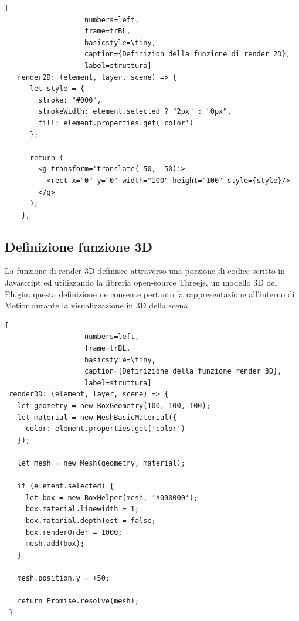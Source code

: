 \begin{lstlisting}[
                   numbers=left,
                   frame=trBL,
                   basicstyle=\tiny,
                   caption={Definizion della funzione di render 2D},
                   label=struttura]
   render2D: (element, layer, scene) => {
      let style = {
        stroke: "#000",
        strokeWidth: element.selected ? "2px" : "0px",
        fill: element.properties.get('color')
      };

      return (
        <g transform='translate(-50, -50)'>
          <rect x="0" y="0" width="100" height="100" style={style}/>
        </g>
      );
    },
\end{lstlisting}
\newpage

\subsection{Definizione funzione 3D}
La funzione di render 3D definisce attraverso una porzione di codice scritto in Javascript ed utilizzando
la libreria open-source Threejs, un modello 3D del Plugin;
questa definizione ne consente pertanto la rappresentazione all'interno di Metior durante la visualizzazione in 3D della scena.\\


\begin{lstlisting}[
                   numbers=left,
                   frame=trBL,
                   basicstyle=\tiny,
                   caption={Definizione della funzione render 3D},
                   label=struttura]
 render3D: (element, layer, scene) => {
   let geometry = new BoxGeometry(100, 100, 100);
   let material = new MeshBasicMaterial({
     color: element.properties.get('color')
   });

   let mesh = new Mesh(geometry, material);

   if (element.selected) {
     let box = new BoxHelper(mesh, '#000000');
     box.material.linewidth = 1;
     box.material.depthTest = false;
     box.renderOrder = 1000;
     mesh.add(box);
   }

   mesh.position.y = +50;

   return Promise.resolve(mesh);
 }
\end{lstlisting}
\newpage

